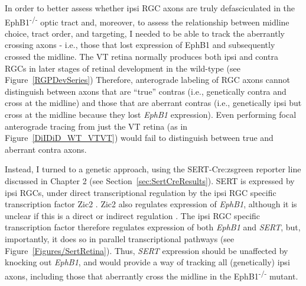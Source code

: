 In order to better assess whether ipsi RGC axons are truly defasciculated in the EphB1\textsuperscript{-/-} optic tract and, moreover, to assess the relationship between midline choice, tract order, and targeting, I needed to be able to track the aberrantly crossing axons - i.e., those that lost expression of EphB1 and subsequently crossed the midline.
The VT retina normally produces both ipsi and contra RGCs in later stages of retinal development in the wild-type (see Figure~\ref{RGPDevSeries})
Therefore, anterograde labeling of RGC axons cannot distinguish between axons that are ``true'' contras (i.e., genetically contra and cross at the midline) and those that are aberrant contras (i.e., genetically ipsi but cross at the midline because they lost \emph{EphB1} expression).
Even performing focal anterograde tracing from just the VT retina (as in Figure~\ref{DiIDiD_WT_VTVT}) would fail to distinguish between true and aberrant contra axons.

Instead, I turned to a genetic approach, using the SERT-Cre:zsgreen reporter line discussed in Chapter 2 (see Section~\ref{sec:SertCreResults}).
SERT is expressed by ipsi RGCs, under direct transcriptional regulation by the ipsi RGC specific transcription factor Zic2 \cite{garcia2010zic2}.
Zic2 also regulates expression of \emph{EphB1}, although it is unclear if this is a direct or indirect regulation \cite{garcia2010zic2}.
The ipsi RGC specific transcription factor therefore regulates expression of both \emph{EphB1} and \emph{SERT}, but, importantly, it does so in parallel transcriptional pathways (see Figure~\ref{Figures/SertRetina}).
Thus, \emph{SERT} expression should be unaffected by knocking out \emph{EphB1}, and would provide a way of tracking all (genetically) ipsi axons, including those that aberrantly cross the midline in the EphB1\textsuperscript{-/-} mutant.

